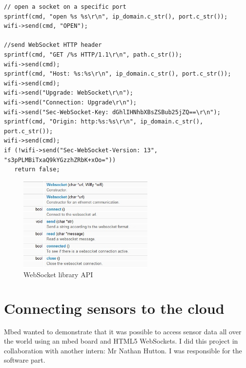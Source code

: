 \documentclass[pdftex,10pt,a4paper]{report}
\begin{document}
\begin{center}
\begin{lstlisting}[label=Connection to a WebSocket server over Wifi,caption=Connection to a WebSocket server over Wifi]
// open a socket on a specific port
sprintf(cmd, "open %s %s\r\n", ip_domain.c_str(), port.c_str());
wifi->send(cmd, "OPEN");

//send WebSocket HTTP header
sprintf(cmd, "GET /%s HTTP/1.1\r\n", path.c_str());
wifi->send(cmd);
sprintf(cmd, "Host: %s:%s\r\n", ip_domain.c_str(), port.c_str());
wifi->send(cmd);
wifi->send("Upgrade: WebSocket\r\n");
wifi->send("Connection: Upgrade\r\n");
wifi->send("Sec-WebSocket-Key: dGhlIHNhbXBsZSBub25jZQ==\r\n");
sprintf(cmd, "Origin: http:%s:%s\r\n", ip_domain.c_str(), port.c_str());
wifi->send(cmd);
if (!wifi->send("Sec-WebSocket-Version: 13", "s3pPLMBiTxaQ9kYGzzhZRbK+xOo="))
   return false;

\end{lstlisting}
\end{center}

\begin{figure}[h!]
		\centering
		\includegraphics[width=0.6\textwidth]{./ws_api.jpg}
		\caption{WebSocket library API}
		\label{WebSocket library API}
\end{figure}




\newpage









\section{Connecting sensors to the cloud}
Mbed wanted to demonstrate that it was possible to access sensor data all over the world using an mbed board and HTML5 WebSockets. I did this project in collaboration with another intern: Mr Nathan Hutton. I was responsible for the software part. \\
\end{document}

